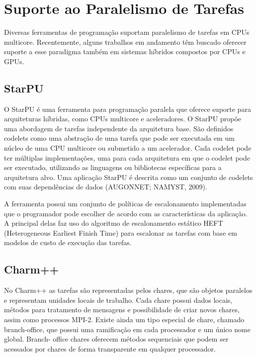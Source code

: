 \section{Suporte ao Paralelismo de Tarefas}
Diversas ferramentas de programação suportam paralelismo de tarefas em CPUs multicore. Recentemente, alguns trabalhos em andamento têm buscado oferecer suporte a esse paradigma também em sistemas híbridos compostos por CPUs e GPUs.


\subsection{StarPU}
 
O StarPU é uma ferramenta para programação paralela que oferece suporte para arquiteturas híbridas, como CPUs multicore e aceleradores. O StarPU propõe uma abordagem de tarefas independente da arquitetura base. São definidos codelets como uma abstração de uma tarefa que pode ser executada em um núcleo de uma CPU multicore ou submetido a um acelerador. Cada codelet pode ter múltiplas implementações, uma para cada arquitetura em que o codelet pode ser executado, utilizando as linguagens ou bibliotecas específicas para a arquitetura alvo. Uma aplicação StarPU é descrita como um conjunto de codelets com suas dependências de dados (AUGONNET; NAMYST, 2009).

A ferramenta possui um conjunto de políticas de escalonamento implementadas que o programador pode escolher de acordo com as características da aplicação. A principal delas faz uso do algoritmo de escalonamento estático HEFT (Heterogeneous Earliest Finish Time) para escalonar as tarefas com base em modelos de custo de execução das tarefas.



\subsection{Charm++}

No Charm++ as tarefas são representadas pelos chares, que são objetos paralelos e representam unidades locais de trabalho. Cada chare possui dados locais, métodos para tratamento de mensagens e possibilidade de criar novos chares, assim como processos MPI-2. Existe ainda um tipo especial de chare, chamado branch-office, que possui uma ramificação em cada processador e um único nome global. Branch- office chares oferecem métodos sequenciais que podem ser acessados por chares de forma transparente em qualquer processador.

